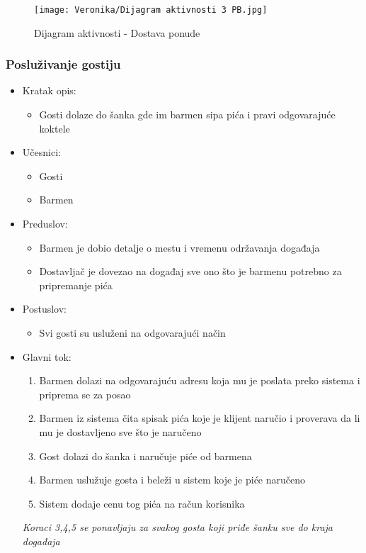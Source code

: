 \documentclass[a4paper]{article}
\begin{document}
\begin{figure}[H]
    \centering
    \texttt{[image: Veronika/Dijagram aktivnosti 3 PB.jpg]}
    \caption{Dijagram aktivnosti - Dostava ponude}
    \label{fig:PrenosiviBar}
\end{figure}

\subsubsection{Posluživanje gostiju}

\begin{itemize}
    \item Kratak opis:
        \begin{itemize}
            \item Gosti dolaze do šanka gde im barmen sipa pića i pravi odgovarajuće koktele 
        \end{itemize}
    \item Učesnici:
        \begin{itemize}
            \item Gosti
            \item Barmen
        \end{itemize}
    \item Preduslov:
        \begin{itemize}
            \item Barmen je dobio detalje o mestu i vremenu održavanja događaja
            \item Dostavljač je dovezao na događaj sve ono što je barmenu potrebno za pripremanje pića
        \end{itemize}
    \item Postuslov:
        \begin{itemize}
            \item Svi gosti su usluženi na odgovarajući način
        \end{itemize}
    \item Glavni tok:
        \begin{enumerate}
            \item Barmen dolazi na odgovarajuću adresu koja mu je poslata preko sistema i priprema se za posao
            \item Barmen iz sistema čita spisak pića koje je klijent naručio i proverava da li mu je dostavljeno sve što je naručeno
           \item Gost dolazi do šanka i naručuje piće od barmena
		   \item Barmen uslužuje gosta i beleži u sistem koje je piće naručeno
		   \item Sistem dodaje cenu tog pića na račun korisnika
		  \end{enumerate}
		\textit{Koraci 3,4,5 se ponavljaju za svakog gosta koji priđe šanku sve do kraja događaja}
	

\end{itemize}
\end{document}
